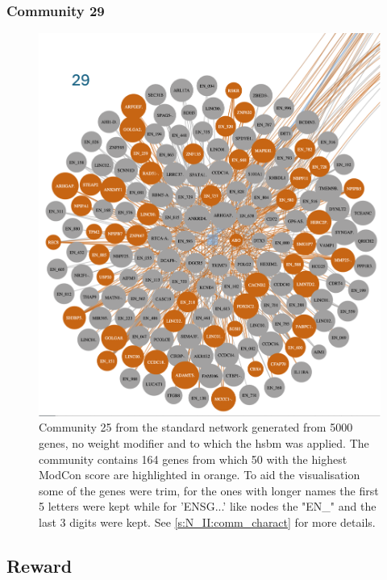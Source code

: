 \subsubsection{Community 29}

\begin{figure}[H]    
    \centering
    \includegraphics[width=1.0\textwidth,height=1.0\textheight,keepaspectratio]{Sections/Network_II/resources/non_tum/29_com.png}
    \caption{Community 25 from the standard network generated from 5000 genes, no weight modifier and to which the \acrshort{hsbm} was applied. The community contains 164 genes from which 50 with the highest ModCon score are highlighted in orange. To aid the visualisation some of the genes were trim, for the ones with longer names the first 5 letters were kept while for 'ENSG...' like nodes the "EN\_" and the last 3 digits were kept.  See \cref{s:N_II:comm_charact} for more details. }
    \label{fig:ap:com_29}
\end{figure}

\subsection{Reward }

